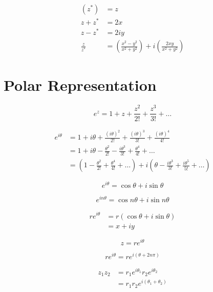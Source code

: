 \begin{align*}
    (z^*) &= z\\
    z + z^* &= 2x\\
    z - z^* &= 2iy\\
    \frac{z}{z^*} &= \left(\frac{x^2-y^2}{x^2+y^2}\right) +
    i \left(\frac{2xy}{x^2 + y^2}\right)
\end{align*}

\section{Polar Representation}

\begin{equation*}
    e^z = 1 + z + \frac{z^2}{2!} + \frac{z^3}{3!} + \dots
\end{equation*}

\begin{align*}
    e^{i\theta} &= 1 + i\theta + \frac{(i\theta)^{2}}{2!} + \frac{(i\theta)^{3}}{3!} + \frac{(i\theta)^{4}}{4!}\\
    &= 1 + i\theta - \frac{\theta^{2}}{2!} - \frac{i\theta^{3}}{3!} + \frac{\theta^{4}}{4!} + \dots\\
    &= \left(1 - \frac{\theta^{2}}{2!} + \frac{\theta^{4}}{4!} + \dots\right) + i\left(\theta - \frac{i\theta^{3}}{3!} + \frac{i\theta^{5}}{5!} + \dots\right)
\end{align*}

\begin{equation*}
    e^{i\theta} = \cos\theta + i\sin\theta
\end{equation*}

\begin{equation*}
    e^{in\theta} = \cos n\theta + i \sin n\theta
\end{equation*}

\begin{align*}
    re^{i\theta} &= r(\cos\theta + i\sin\theta)\\
    &= x + iy
\end{align*}

\begin{equation*}
    z = re^{i\theta}
\end{equation*}

\begin{equation*}
    re^{i\theta} = re^{i(\theta + 2n\pi)}
\end{equation*}

\begin{align*}
    z_1z_2 &= r_1e^{i\theta_1}r_2e^{i\theta_2}\\
    &= r_1r_2e^{i(\theta_1 + \theta_2)}
\end{align*}


